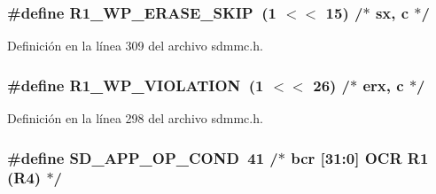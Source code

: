\subsubsection[{\texorpdfstring{R1\+\_\+\+W\+P\+\_\+\+E\+R\+A\+S\+E\+\_\+\+S\+K\+IP}{R1_WP_ERASE_SKIP}}]{\setlength{\rightskip}{0pt plus 5cm}\#define R1\+\_\+\+W\+P\+\_\+\+E\+R\+A\+S\+E\+\_\+\+S\+K\+IP~(1 $<$$<$ 15)	/$\ast$ sx, c $\ast$/}\hypertarget{group___c_h_i_p___s_d_m_m_c___definitions_gacdd25972bcd7e3a926655a05be4d88d9}{}\label{group___c_h_i_p___s_d_m_m_c___definitions_gacdd25972bcd7e3a926655a05be4d88d9}


Definición en la línea 309 del archivo sdmmc.\+h.

\subsubsection[{\texorpdfstring{R1\+\_\+\+W\+P\+\_\+\+V\+I\+O\+L\+A\+T\+I\+ON}{R1_WP_VIOLATION}}]{\setlength{\rightskip}{0pt plus 5cm}\#define R1\+\_\+\+W\+P\+\_\+\+V\+I\+O\+L\+A\+T\+I\+ON~(1 $<$$<$ 26)	/$\ast$ erx, c $\ast$/}\hypertarget{group___c_h_i_p___s_d_m_m_c___definitions_ga84f6d61dd984a9fd727ad6a810947c1d}{}\label{group___c_h_i_p___s_d_m_m_c___definitions_ga84f6d61dd984a9fd727ad6a810947c1d}


Definición en la línea 298 del archivo sdmmc.\+h.

\subsubsection[{\texorpdfstring{S\+D\+\_\+\+A\+P\+P\+\_\+\+O\+P\+\_\+\+C\+O\+ND}{SD_APP_OP_COND}}]{\setlength{\rightskip}{0pt plus 5cm}\#define S\+D\+\_\+\+A\+P\+P\+\_\+\+O\+P\+\_\+\+C\+O\+ND~41		/$\ast$ bcr  \mbox{[}31\+:0\mbox{]}  O\+CR        R1 (R4)  $\ast$/}\hypertarget{group___c_h_i_p___s_d_m_m_c___definitions_ga612ec5173527128c99c16e0f4bb2299d}{}\label{group___c_h_i_p___s_d_m_m_c___definitions_ga612ec5173527128c99c16e0f4bb2299d}


